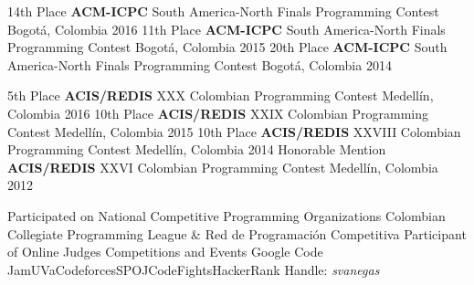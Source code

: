\begin{cvhonors}
  \cvhonor
    {14th Place}
    {\textbf{ACM-ICPC} South America-North Finals Programming Contest}
    {Bogotá, Colombia}
    {2016}
  \cvhonor
    {11th Place}
    {\textbf{ACM-ICPC} South America-North Finals Programming Contest}
    {Bogotá, Colombia}
    {2015}
  \cvhonor
    {20th Place}
    {\textbf{ACM-ICPC} South America-North Finals Programming Contest}
    {Bogotá, Colombia}
    {2014}
\end{cvhonors}

\begin{cvhonors}
  \cvhonor
    {5th Place}
    {\textbf{ACIS/REDIS} XXX Colombian Programming Contest}
    {Medellín, Colombia}
    {2016}
  \cvhonor
    {10th Place}
    {\textbf{ACIS/REDIS} XXIX Colombian Programming Contest}
    {Medellín, Colombia}
    {2015}
  \cvhonor
    {10th Place}
    {\textbf{ACIS/REDIS} XXVIII Colombian Programming Contest}
    {Medellín, Colombia}
    {2014}
  \cvhonor
    {Honorable Mention}
    {\textbf{ACIS/REDIS} XXVI Colombian Programming Contest}
    {Medellín, Colombia}
    {2012}
\end{cvhonors}

\begin{cvhonors}
  \cvhonor
    {Participated on National Competitive Programming Organizations}
    {Colombian Collegiate Programming League \& Red de Programación Competitiva}
    {}
    {}
  \cvhonor
    {Participant of Online Judges Competitions and Events}
    {Google Code Jam{\dotsep}UVa{\dotsep}Codeforces{\dotsep}SPOJ{\dotsep}CodeFights{\dotsep}HackerRank}
    {Handle: \textit{svanegas}}
    {}
\end{cvhonors}
